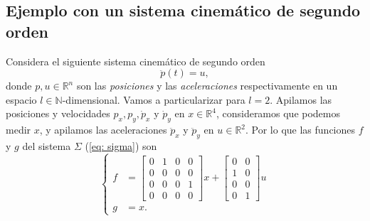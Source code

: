 \subsection{Ejemplo con un sistema cinemático de segundo orden}
Considera el siguiente sistema cinemático de segundo orden
\begin{equation}
	\ddot p(t) = u,
	\label{eq: pdyn}
\end{equation}
donde $p,u\in\mathbb{R}^n$ son las \emph{posiciones} y las \emph{aceleraciones} respectivamente en un espacio $l\in\mathbb{N}$-dimensional. Vamos a particularizar para $l=2$. Apilamos las posiciones y velocidades $p_x,p_y,\dot p_x$ y $\dot p_y$ en $x\in\mathbb{R}^4$, consideramos que podemos medir $x$, y apilamos las aceleraciones $\ddot p_x$ y $\ddot p_y$ en $u\in\mathbb{R}^2$. Por lo que las funciones $f$ y $g$ del sistema $\Sigma$ (\ref{eq: sigma}) son
\begin{equation}
	\begin{cases}
		f &= \begin{bmatrix}0 & 1 & 0 & 0 \\ 0 & 0 & 0 & 0 \\
		0 & 0 & 0 & 1 \\ 0 & 0 & 0 & 0 \end{bmatrix} x + \begin{bmatrix}0 & 0  \\ 1 & 0  \\ 0 & 0 \\ 0 & 1\end{bmatrix} u \\
			g &= x.
\end{cases}
\end{equation}


